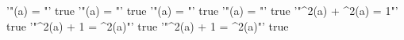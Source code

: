 '"\sin(a) = "' true
'"\cos(a) = "' true
'"\tan(a) = "' true
'"\cotan(a) = "' true
'"\sin^2(a) + \cos^2(a) = 1"' true
'"\tan^2(a) + 1 = \sec^2(a)"' true
'"\cot^2(a) + 1 = \csc^2(a)"' true
